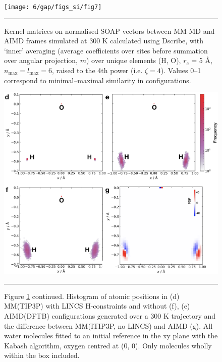 \documentclass[../../main.tex]{subfiles}
\begin{document}
\begin{figure}[h!]
	\vspace{0.4cm}
	\centering
	\texttt{[image: 6/gap/figs\_si/fig7]}
	\vspace{0.2cm}
	\hrule
	\caption{Kernel matrices on normalised SOAP vectors between MM-MD and AIMD frames simulated at 300 K calculated using Dscribe,\cite{Himanen2020} with ‘inner’ averaging (average coefficients over sites before summation over angular projection, $m$) over unique elements (H, O), $r_c$ = 5 \AA, $n_\text{max}=l_\text{max}=6$, raised to the 4th power (i.e. $\zeta=4$). Values 0--1 correspond to minimal–maximal similarity in configurations.}
	\label{fig::ml_si_7}
\end{figure}




\begin{figure}[h!]
	\vspace{0.4cm}
	\centering
	\includegraphics[width=\textwidth]{6/gap/figs_si/fig7cont}
	\vspace{0.2cm}
	\hrule
	\caption{Figure \ref{fig::ml_si_7} continued. Histogram of atomic positions in (d) MM(TIP3P) with LINCS H-constraints and without (f), (e) AIMD(DFTB) configurations generated over a 300 K trajectory and the difference between MM(ITIP3P, no LINCS) and AIMD (g). All water molecules fitted to an initial reference in the xy plane with the Kabash algorithm, oxygen centred at (0, 0). Only molecules wholly within the box included.}
	\label{fig::ml_si_7cont}
\end{figure}
\end{document}
